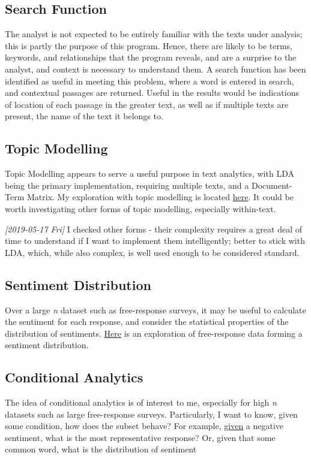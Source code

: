 \documentclass[a4paper, 11pt]{article}
\begin{document}
\subsection{Search Function}
\label{sec:orgcfe14ef}
The analyst is not expected to be entirely familiar with the texts
under analysis; this is partly the purpose of this program. Hence,
there are likely to be terms, keywords, and relationships that the
program reveals, and are a surprise to the analyst, and context is
necessary to understand them. A search function has been identified as
useful in meeting this problem, where a word is entered in search, and
contextual passages are returned. Useful in the results would be
indications of location of each passage in the greater text, as well
as if multiple texts are present, the name of the text it belongs to.

\subsection{Topic Modelling}
\label{sec:org12d768e}
Topic Modelling appears to serve a useful purpose in text analytics,
with LDA being the primary implementation, requiring multiple texts,
and a Document-Term Matrix. My exploration with topic modelling is
located \href{topic-modelling.Rmd}{here}. It could be worth investigating other forms of topic
modelling, especially within-text.

\textit{[2019-05-17 Fri] } I checked other forms - their complexity requires a
great deal of time to understand if I want to implement them
intelligently; better to stick with LDA, which, while also complex, is
well used enough to be considered standard.
\subsection{Sentiment Distribution}
\label{sec:org70f6259}
Over a large \emph{n} dataset such as free-response surveys, it may be
useful to calculate the sentiment for each response, and consider the
statistical properties of the distribution of sentiments. \href{sent-dist.org}{Here} is an
exploration of free-response data forming a sentiment distribution.
\subsection{Conditional Analytics}
\label{sec:org4915caf}
The idea of conditional analytics is of interest to me, especially for
high \emph{n} datasets such as large free-response surveys. Particularly, I
want to know, given some condition, how does the subset behave? For
example, \href{sent-dist.org}{given} a negative sentiment, what is the most representative
response? Or, given that some common word, what is the distribution of
sentiment
\end{document}
